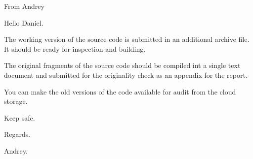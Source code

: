 From Andrey

Hello Daniel.

The working version of the source code is submitted in an additional archive file. It should be ready for inspection and building.

The original fragments of the source code should be compiled int a single text document and submitted for the originality check as an appendix for the report.

You can make the old versions of the code available for audit from the cloud storage.

 

Keep safe.

Regards.

Andrey.
